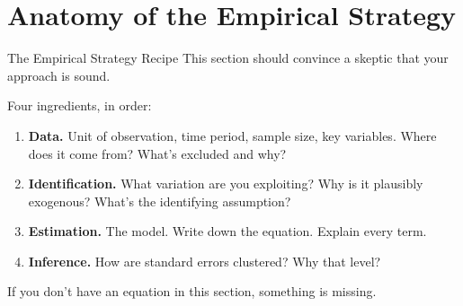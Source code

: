 \section{Anatomy of the Empirical Strategy}

\begin{frame}{The Empirical Strategy Recipe}
  This section should convince a skeptic that your approach is sound.

  \vspace{8pt}

  Four ingredients, in order:

  \vspace{4pt}

  \begin{enumerate}
    \item \textbf{Data.} Unit of observation, time period, sample size, key variables. Where does it come from? What's excluded and why?
    \item \textbf{Identification.} What variation are you exploiting? Why is it plausibly exogenous? What's the identifying assumption?
    \item \textbf{Estimation.} The model. Write down the equation. Explain every term.
    \item \textbf{Inference.} How are standard errors clustered? Why that level?
  \end{enumerate}

  \vspace{6pt}

  If you don't have an equation in this section, something is missing.
\end{frame}

